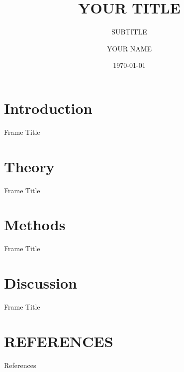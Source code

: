 \documentclass{beamer}
\title{YOUR TITLE}
\subtitle{SUBTITLE}
\author[shortname]{YOUR NAME}
\institute[shortinst]{INSTITUTION}
\date{\today}
\begin{document}
\maketitle

\section{Introduction}
\begin{frame}{Frame Title}
    
\end{frame}

\section{Theory}
\begin{frame}{Frame Title}
    
\end{frame}

\section{Methods}
\begin{frame}{Frame Title}
    
\end{frame}

\section{Discussion}
\begin{frame}{Frame Title}
    
\end{frame}

\section*{REFERENCES}
\begin{frame}[allowframebreaks]{References}
    \tiny
\end{frame}

\appendix
\end{document}
